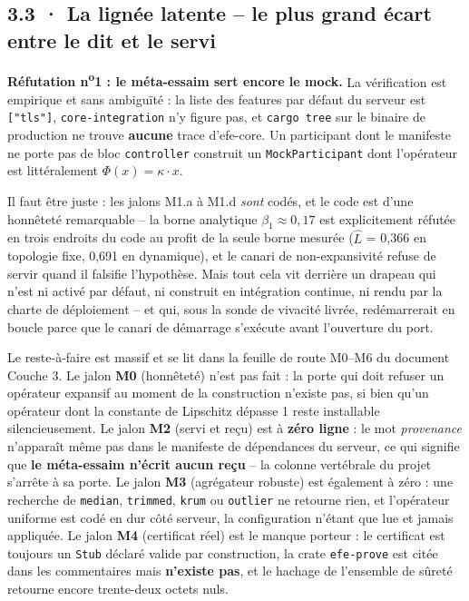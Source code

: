 \documentclass[10pt]{article}
\newcommand{\code}[1]{\texttt{\small #1}}
\begin{document}
\subsection{3.3 · La lignée latente -- le plus grand écart entre le dit et le servi}

\textbf{Réfutation n\textsuperscript{o}1 : le méta-essaim sert encore le mock.} La vérification est
empirique et sans ambiguïté : la liste des features par défaut du serveur est \code{["tls"]},
\code{core-integration} n'y figure pas, et \code{cargo tree} sur le binaire de production ne trouve
\textbf{aucune} trace d'efe-core. Un participant dont le manifeste ne porte pas de bloc
\code{controller} construit un \code{MockParticipant} dont l'opérateur est littéralement
$\Phi(x) = \kappa \cdot x$.

Il faut être juste : les jalons M1.a à M1.d \emph{sont} codés, et le code est d'une honnêteté
remarquable -- la borne analytique $\beta_1 \approx 0{,}17$ est explicitement réfutée en trois endroits
du code au profit de la seule borne mesurée ($\hat{L}$ = 0,366 en topologie fixe, 0,691 en dynamique),
et le canari de non-expansivité refuse de servir quand il falsifie l'hypothèse. Mais tout cela vit
derrière un drapeau qui n'est ni activé par défaut, ni construit en intégration continue, ni rendu par
la charte de déploiement -- et qui, sous la sonde de vivacité livrée, redémarrerait en boucle parce que
le canari de démarrage s'exécute avant l'ouverture du port.

Le reste-à-faire est massif et se lit dans la feuille de route M0--M6 du document Couche 3. Le jalon
\textbf{M0} (honnêteté) n'est pas fait : la porte qui doit refuser un opérateur expansif au moment de
la construction n'existe pas, si bien qu'un opérateur dont la constante de Lipschitz dépasse 1 reste
installable silencieusement. Le jalon \textbf{M2} (servi et reçu) est à \textbf{zéro ligne} : le mot
\emph{provenance} n'apparaît même pas dans le manifeste de dépendances du serveur, ce qui signifie que
\textbf{le méta-essaim n'écrit aucun reçu} -- la colonne vertébrale du projet s'arrête à sa porte. Le
jalon \textbf{M3} (agrégateur robuste) est également à zéro : une recherche de \code{median},
\code{trimmed}, \code{krum} ou \code{outlier} ne retourne rien, et l'opérateur uniforme est codé en dur
côté serveur, la configuration n'étant que lue et jamais appliquée. Le jalon \textbf{M4} (certificat
réel) est le manque porteur : le certificat est toujours un \code{Stub} déclaré valide par
construction, la crate \code{efe-prove} est citée dans les commentaires mais \textbf{n'existe pas}, et
le hachage de l'ensemble de sûreté retourne encore trente-deux octets nuls.
\end{document}
